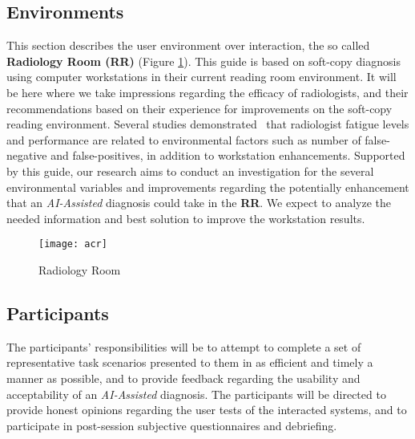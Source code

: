 \subsection{Environments}

This section describes the user environment over interaction, the so called \textbf{Radiology Room (RR)} (Figure \ref{fig:radioroom}). This guide is based on soft-copy diagnosis using computer workstations in their current reading room environment. It will be here where we take impressions regarding the efficacy of radiologists, and their recommendations based on their experience for improvements on the soft-copy reading environment. Several studies demonstrated~\cite{waite2017tired} that radiologist fatigue levels and performance are related to environmental factors such as number of false-negative and false-positives, in addition to workstation enhancements. Supported by this guide, our research aims to conduct an investigation for the several environmental variables and improvements regarding the potentially enhancement that an \textit{AI-Assisted} diagnosis could take in the \textbf{RR}. We expect to analyze the needed information and best solution to improve the workstation results.


\hfill

\begin{figure}[h]
\centering
\texttt{[image: acr]}
\caption{Radiology Room}
\label{fig:radioroom}
\end{figure}

\hfill



\subsection{Participants}

The participants' responsibilities will be to attempt to complete a set of representative task scenarios presented to them in as efficient and timely a manner as possible, and to provide feedback regarding the usability and acceptability of an \textit{AI-Assisted} diagnosis. The participants will be directed to provide honest opinions regarding the user tests of the interacted systems, and to participate in post-session subjective questionnaires and debriefing.

